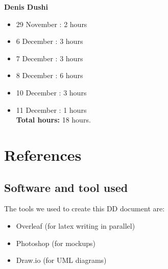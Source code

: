 \documentclass[a4paper]{article}
\begin{document}
\textbf{Denis Dushi}
\begin{itemize}
\item 29 November : 2 hours
\item 6 December : 3 hours
\item 7 December : 3 hours
\item 8 December : 6 hours
\item 10 December : 3 hours
\item 11 December : 1 hours\\

\textbf{Total hours:} 18 hours.
\end{itemize}

\newpage
\section{References}
\subsection{Software and tool used}
The tools we used to create this DD document are:
\begin{itemize}
\item Overleaf (for latex writing in parallel)
\item Photoshop (for mockups)
\item Draw.io (for UML diagrams)
\end{itemize}

\newpage
\listoffigures
\end{document}

